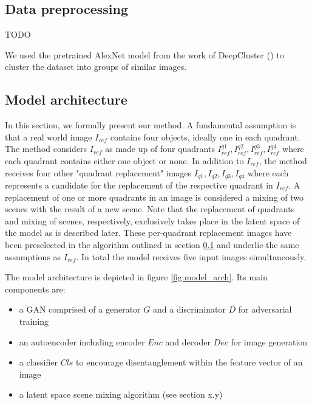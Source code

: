 \documentclass[12pt,a4paper]{article}
\begin{document}
\subsection{Data preprocessing} \label{data_preprocessing}
TODO
\par We used the pretrained AlexNet model from the work of DeepCluster (\cite{1807.05520}) to cluster the dataset into groups of similar images.

\subsection{Model architecture}
In this section, we formally present our method. A fundamental assumption is that a real world image $I_{ref}$ contains four objects, ideally one in each quadrant. The method considers $I_{ref}$ as made up of four quadrants $I^{q1}_{ref}, I^{q2}_{ref}, I^{q3}_{ref}, I^{q4}_{ref}$ where each quadrant contains either one object or none. In addition to $I_{ref}$, the method receives four other "quadrant replacement" images $I_{q1},I_{q2},I_{q3},I_{q4}$ where each represents a candidate for the replacement of the respective quadrant in $I_{ref}$. A replacement of one or more quadrants in an image is considered a mixing of two scenes with the result of a new scene. Note that the replacement of quadrants and mixing of scenes, respectively, exclusively takes place in the latent space of the model as is described later. These per-quadrant replacement images have been preselected in the algorithm outlined in section \ref{data_preprocessing} and underlie the same assumptions as $I_{ref}$. In total the model receives five input images simultaneously.

The model architecture is depicted in figure \ref{fig:model_arch}. Its main components are:

\begin{itemize}
   \item a GAN comprised of a generator $G$ and a discriminator $D$ for adversarial training
   \item an autoencoder including encoder $Enc$ and decoder $Dec$ for image generation
   \item a classifier $Cls$ to encourage disentanglement within the feature vector of an image
   \item a latent space scene mixing algorithm (see section x.y)
\end{itemize}
 
\end{document}
